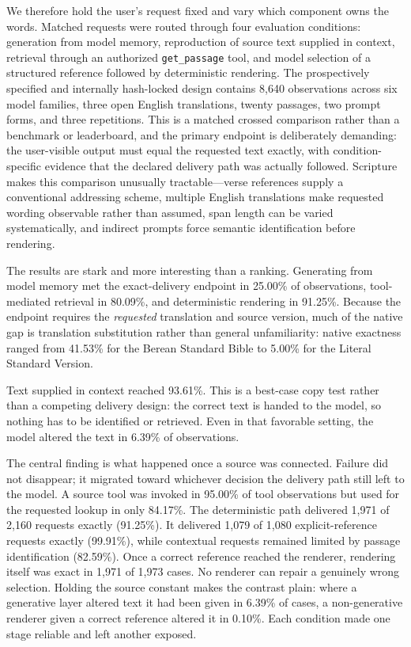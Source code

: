 \documentclass[11pt]{article}
\begin{document}
We therefore hold the user's request fixed and vary which component owns the
words. Matched requests were routed through four evaluation conditions: generation from
model memory, reproduction of source text supplied in context, retrieval
through an authorized \texttt{get\_passage} tool, and model selection of a
structured reference followed by deterministic rendering. The prospectively
specified and internally hash-locked design contains 8,640 observations across
six model families, three open English translations, twenty passages, two prompt
forms, and three repetitions. This is a matched crossed comparison rather than
a benchmark or leaderboard, and the primary endpoint is deliberately
demanding: the user-visible output must equal the requested text exactly, with
condition-specific evidence that the declared delivery path was actually
followed. Scripture makes this comparison unusually tractable---verse
references supply a conventional addressing scheme, multiple English
translations make requested wording observable rather than assumed, span length
can be varied systematically, and indirect prompts force semantic
identification before rendering.

The results are stark and more interesting than a ranking. Generating from
model memory met the exact-delivery endpoint in 25.00\% of observations,
tool-mediated retrieval in 80.09\%, and deterministic rendering in 91.25\%.
Because the
endpoint requires the \emph{requested} translation and source version, much of
the native gap is translation substitution rather than general unfamiliarity: native exactness ranged
from 41.53\% for the Berean Standard Bible to 5.00\% for the Literal Standard
Version.

Text supplied in context reached 93.61\%. This is a best-case copy test rather
than a competing delivery design: the correct text is handed to the model, so
nothing has to be identified or retrieved. Even in that favorable setting, the
model altered the text in 6.39\% of observations.

The central finding is what happened once a source was connected. Failure did
not disappear; it migrated toward whichever decision the delivery path still
left to the model. A source tool was invoked in 95.00\% of tool observations
but used for the requested lookup in only 84.17\%. The deterministic path
delivered 1,971 of 2,160 requests exactly (91.25\%). It
delivered 1,079 of 1,080 explicit-reference requests exactly (99.91\%), while
contextual requests remained limited by passage identification (82.59\%). Once
a correct reference reached the renderer, rendering itself was exact in 1,971
of 1,973 cases. No renderer can repair a genuinely wrong selection.
Holding the source constant makes
the contrast plain: where a generative layer altered text it had been given in
6.39\% of cases, a non-generative renderer given a correct reference altered it
in 0.10\%. Each condition made one stage reliable and left another
exposed.
\end{document}

